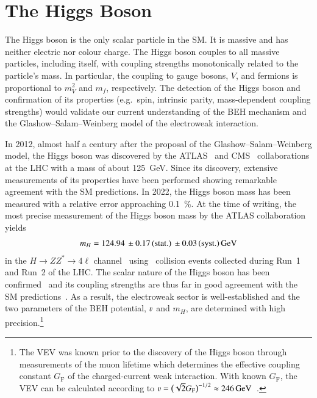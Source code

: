 \section{The Higgs Boson}%
\label{sec:higgs_boson}

The Higgs boson is the only scalar particle in the SM. It is massive and has
neither electric nor colour charge. The Higgs boson couples to all massive
particles, including itself, with coupling strengths monotonically related to
the particle's mass. In particular, the coupling to gauge bosons, $V$, and
fermions is proportional to $m_V^2$ and $m_f$, respectively.
The detection of the Higgs boson and confirmation of its
properties (e.g.\ spin, intrinsic parity, mass-dependent coupling strengths)
would validate our current understanding of the BEH mechanism and the
Glashow--Salam--Weinberg model of the electroweak interaction.

In 2012, almost half a century after the proposal of the
Glashow--Salam--Weinberg model, the Higgs boson was discovered by the
ATLAS~\cite{HIGG-2012-27} and CMS~\cite{CMS-HIG-12-028} collaborations at the
LHC with a mass of about \SI{125}{\GeV}. Since its discovery, extensive
measurements of its properties have been performed showing remarkable agreement
with the SM predictions. In 2022, the Higgs boson mass has been measured with a
relative error approaching \SI{0.1}{\percent}. At the time of writing, the most
precise measurement of the Higgs boson mass by the ATLAS collaboration yields
\begin{align*}
  m_{H} = \num{124.94}%
  \valuesep\numerrt{0.17}{stat.}%
  \valuesep\numerrt{0.03}{syst.}%
  \valuesep\si{\GeV}
\end{align*}
in the $H \to Z Z^{*} \to 4\ell$ channel~\cite{HIGG-2020-07} using \pp~collision
events collected during Run~1 and Run~2 of the LHC. The scalar nature of the
Higgs boson has been confirmed~\cite{HIGG-2013-17-witherratum,CMS-HIG-14-018}
and its coupling strengths are thus far in good agreement with the SM
predictions~\cite{HIGG-2021-23,CMS-HIG-22-001}. As a result, the electroweak
sector is well-established and the two parameters of the BEH potential, $\varv$ and
$m_{H}$, are determined with high precision.\footnote{The VEV was known prior to
  the discovery of the Higgs boson through measurements of the muon lifetime
  which determines the effective coupling constant $G_{\text{F}}$ of the
  charged-current weak interaction. With known $G_{\text{F}}$, the VEV can be
  calculated according to
  $\varv = \bigl( \sqrt{2} G_{\text{F}} \bigr)^{-1/2} \approx
  \SI{246}{\GeV}$~\cite{MuLan:2010shf}.}


